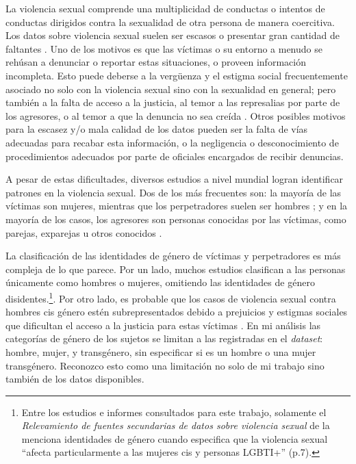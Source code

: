 \documentclass[10 pt]{article}
\begin{document}
La violencia sexual comprende una multiplicidad de conductas o intentos de conductas dirigidos contra la sexualidad de otra persona de manera coercitiva. Los datos sobre violencia sexual suelen ser escasos o presentar gran cantidad de faltantes \citetext{\citealp[p.~150]{ferris2002world}}. Uno de los motivos es que las víctimas o su entorno a menudo se rehúsan a denunciar o reportar estas situaciones, o proveen información incompleta. Esto puede deberse a la vergüenza y el estigma social frecuentemente asociado no solo con la violencia sexual sino con la sexualidad en general; pero también a la falta de acceso a la justicia, al temor a las represalias por parte de los agresores, o al temor a que la denuncia no sea creída \citetext{\citealp{murphy2022unfounded}}. Otros posibles motivos para la escasez y/o mala calidad de los datos pueden ser la falta de vías adecuadas para recabar esta información, o la negligencia o desconocimiento de procedimientos adecuados por parte de oficiales encargados de recibir denuncias. 

A pesar de estas dificultades, diversos estudios a nivel mundial logran identificar patrones en la violencia sexual. Dos de los más frecuentes son: la mayoría de las víctimas son mujeres, mientras que los perpetradores suelen ser hombres \citetext{\citealp[p.~149]{ferris2002world}; \citealp[p.~15]{contreras2016violencia}}; y en la mayoría de los casos, los agresores son personas conocidas por las víctimas, como parejas, exparejas u otros conocidos \citetext{\citealp[p.~9]{garcia2005multi},\citealp[p.~22]{unicef2018analisis}, \citealp[p.~151]{ferris2002world}}.
 
La clasificación de las identidades de género de víctimas y perpetradores es más compleja de lo que parece. Por un lado, muchos estudios clasifican a las personas únicamente como hombres o mujeres, omitiendo las identidades de género disidentes.\footnote{Entre los estudios e informes consultados para este trabajo, solamente el \textit{Relevamiento de fuentes secundarias de datos sobre violencia sexual} de la \citet{ufem_relevamiento} menciona identidades de género cuando especifica que la violencia sexual “afecta particularmente a las mujeres cis y personas LGBTI+” (p.7).}. Por otro lado, es probable que los casos de violencia sexual contra hombres cis género estén subrepresentados debido a prejuicios y estigmas sociales que dificultan el acceso a la justicia para estas víctimas \citep*[p.~149]{ferris2002world}. En mi análisis las categorías de género de los sujetos se limitan a las registradas en el \textit{dataset}: hombre, mujer, y transgénero, sin especificar si es un hombre o una mujer transgénero. Reconozco esto como una limitación no solo de mi trabajo sino también de los datos disponibles. 
\end{document}
